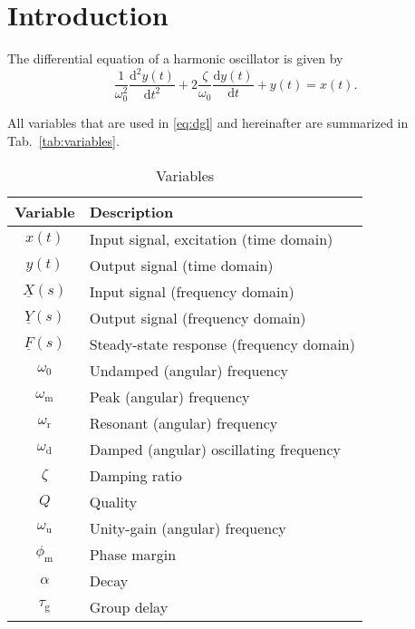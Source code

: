 \documentclass{article}[11pt]
\begin{document}
\notetitle

\section{Introduction}

The differential equation of a harmonic oscillator is given by
\begin{equation}\label{eq:dgl}
\frac{1}{\omega_0^2} \frac{\mathrm{d}^2y(t)}{\mathrm{d}t^2} 
  + 2\frac{\zeta}{\omega_0}\frac{\mathrm{d}y(t)}{\mathrm{d}t} + y(t) = x(t).
\end{equation}

All variables that are used in \eqref{eq:dgl} and hereinafter are summarized 
in Tab.~\ref{tab:variables}.
\begin{table}[H]
\centering
\caption{Variables}
\begin{tabular}{cl}
\toprule
\textbf{Variable}     & \textbf{Description}                     \\ \midrule
$x(t)$                & Input signal, excitation (time domain)   \\ 
$y(t)$                & Output signal (time domain)              \\ 
$\underline{X}(s)$    & Input signal (frequency domain)          \\ 
$\underline{Y}(s)$    & Output signal (frequency domain)         \\
$\underline{F}(s)$    & Steady-state response (frequency domain) \\
$\omega_0$            & Undamped (angular) frequency             \\
$\omega_{\mathrm{m}}$ & Peak (angular) frequency                 \\
$\omega_{\mathrm{r}}$ & Resonant (angular) frequency             \\
$\omega_{\mathrm{d}}$ & Damped (angular) oscillating frequency   \\
$\zeta$               & Damping ratio                            \\
$Q$                   & Quality                                  \\
$\omega_{\mathrm{u}}$ & Unity-gain (angular) frequency           \\
$\phi_{\mathrm{m}}$   & Phase margin                             \\
$\alpha$              & Decay                                    \\ 
$\tau_{\mathrm{g}}$   & Group delay                              \\ 

\end{tabular}
\end{table}
\end{document}
